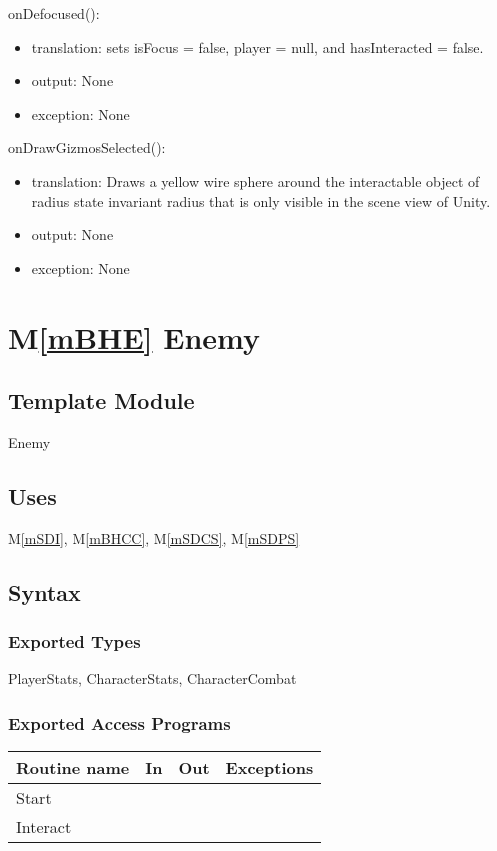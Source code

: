 \documentclass[12pt]{article}
\newcommand{\mref}[1]{M\ref{#1}}
\begin{document}
\noindent onDefocused():
\begin{itemize}
\item translation: sets isFocus = false, player = null, and hasInteracted = false.
\item output: None
\item exception: None
\end{itemize}

\noindent onDrawGizmosSelected():
\begin{itemize}
\item translation: Draws a yellow wire sphere around the interactable object of radius state invariant radius that is only visible in the scene view of Unity.
\item output: None
\item exception: None
\end{itemize}

\section* {\mref{mBHE} Enemy}

\subsection*{Template Module}

Enemy

\subsection* {Uses}

\mref{mSDI}, \mref{mBHCC}, \mref{mSDCS}, \mref{mSDPS}

\subsection* {Syntax}

\subsubsection* {Exported Types}

PlayerStats, CharacterStats, CharacterCombat

\subsubsection* {Exported Access Programs}

\begin{tabular}{| l | l | l | l |}
\hline
\textbf{Routine name} & \textbf{In} & \textbf{Out} & \textbf{Exceptions}\\
\hline
Start & ~ & ~  & ~\\
Interact & ~ & ~ & ~\\
\hline
\end{tabular}
\end{document}
